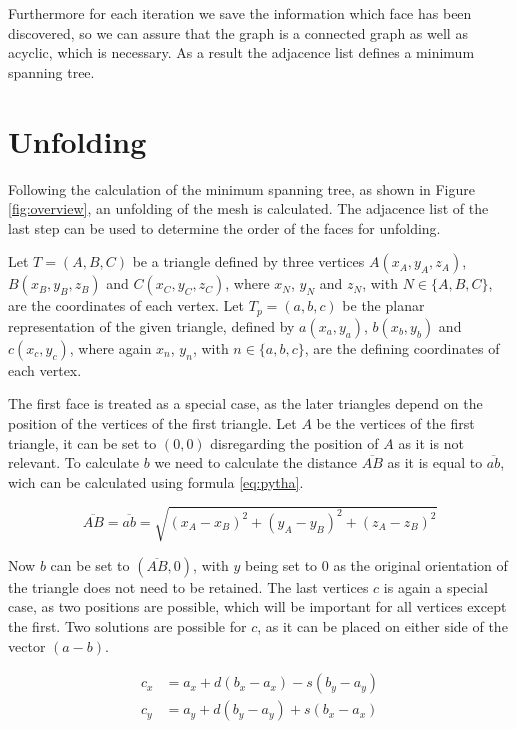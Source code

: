 \documentclass[draft,final]{vutinfth} %
\begin{document}
Furthermore for each iteration we save the information which face has been discovered, so we can assure that the graph is a connected graph as well as acyclic, which is necessary. As a result the adjacence list defines a minimum spanning tree.

\section{Unfolding}

Following the calculation of the minimum spanning tree, as shown in Figure \ref{fig:overview}, an unfolding of the mesh is calculated. The adjacence list of the last step can be used to determine the order of the faces for unfolding.

Let $T = (A,B,C)$ be a triangle defined by three vertices $A(x_A, y_A, z_A)$, $B(x_B, y_B, z_B)$ and $C(x_C, y_C, z_C)$, where $x_N$, $y_N$ and $z_N$, with $N \in \{A,B,C\}$, are the coordinates of each vertex. Let $T_p = (a, b, c)$ be the planar representation of the given triangle, defined by $a(x_a, y_a)$, $b(x_b, y_b)$ and $c(x_c, y_c)$, where again $x_n$, $y_n$, with $n \in \{a,b,c\}$, are the defining coordinates of each vertex.

The first face is treated as a special case, as the later triangles depend on the position of the vertices of the first triangle. Let $A$ be the vertices of the first triangle, it can be set to $(0,0)$ disregarding the position of $A$ as it is not relevant. To calculate $b$ we need to calculate the distance $\overline{AB}$ as it is equal to $\overline{ab}$, wich can be calculated using formula \ref{eq:pytha}.

\begin{equation}
\label{eq:pytha}
\overline{AB} = \overline{ab} = \sqrt{(x_A - x_B)^2 + (y_A - y_B)^2 + (z_A - z_B)^2}
\end{equation}

Now $b$ can be set to $(\overline{AB}, 0)$, with $y$ being set to $0$ as the original orientation of the triangle does not need to be retained. The last vertices $c$ is again a special case, as two positions are possible, which will be important for all vertices except the first. Two solutions are possible for $c$, as it can be placed on either side of the vector $(a-b)$. 

\begin{equation}
\label{eq:cone}
\begin{split}
c_x &= a_x + d(b_x - a_x) - s(b_y - a_y)\\
c_y &= a_y + d(b_y - a_y) + s(b_x - a_x)
\end{split}
\end{equation}
\end{document}
